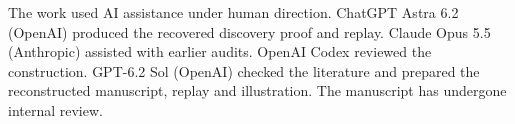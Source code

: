 \documentclass[11pt,a4paper]{amsart}
\begin{document}
The work used AI assistance under human direction. ChatGPT Astra 6.2 (OpenAI) produced the recovered discovery proof and replay. Claude Opus 5.5 (Anthropic) assisted with earlier audits. OpenAI Codex reviewed the construction. GPT-6.2 Sol (OpenAI) checked the literature and prepared the reconstructed manuscript, replay and illustration. The manuscript has undergone internal review.

\renewcommand{\bibliofont}{\normalsize}


\end{document}
